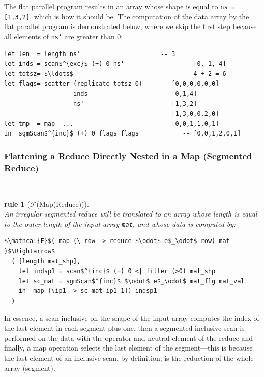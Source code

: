 \documentclass[acmsmall,review]{acmart}\settopmatter{printfolios=true,printccs=false,printacmref=false}
\newtheorem{rewrite}{rule}
\begin{document}
The flat parallel program results in an array whose shape is 
equal to {\tt ns = [1,3,2]}, which is how it should be.
The computation of the data array by the flat parallel program is
demonstrated below, where we skip the first step because all elements
of {\tt ns'} are greater than $0$:
\begin{lstlisting}[mathescape=true]
let len  = length ns'                      -- 3
let inds = scan$^{exc}$ (+) 0 ns'                -- [0, 1, 4]
let totsz= $\ldots$                              -- 4 + 2 = 6 
let flags= scatter (replicate totsz 0)     -- [0,0,0,0,0,0]
                   inds                    -- [0,1,4]
                   ns'                     -- [1,3,2]
                                           -- [1,3,0,0,2,0]
let tmp  = map  ...                        -- [0,0,1,1,0,1]
in  sgmScan$^{inc}$ (+) 0 flags flags            -- [0,0,1,2,0,1]
\end{lstlisting}\vspace{-2ex}

\subsubsection{Flattening a Reduce Directly Nested in a Map (Segmented Reduce)}
\label{subsubsec:red-in-map}
$\mbox{ }$\\

\begin{rewrite}[$\mathcal{F}$(Map(Reduce))]\label{Flat-Red-In-Map}
$\mbox{ }$\\
An irregular segmented reduce will be translated to an array whose
length is equal to the outer length of the input array {\tt mat}, and
whose data is computed by: 
\begin{lstlisting}[mathescape=true]
$\mathcal{F}$( map (\ row -> reduce $\odot$ e$_\odot$ row) mat )$\Rightarrow$
  ( [length mat_shp],
    let indsp1 = scan$^{inc}$ (+) 0 <| filter (>0) mat_shp
    let sc_mat = sgmScan$^{inc}$ $\odot$ e$_\odot$ mat_flg mat_val
    in  map (\ip1 -> sc_mat[ip1-1]) indsp1
  )
\end{lstlisting}\vspace{-2ex}
\end{rewrite}

In essence, a scan inclusive on the shape of the input array computes
the index of the last element in each segment plus one, then a segmented
inclusive scan is performed on the data with the operator and neutral
element of the reduce and finally, a map operation selects the last
element of the segment---this is because the last element of an inclusive
scan, by definition, is the reduction of the whole array (segment). 
\end{document}
